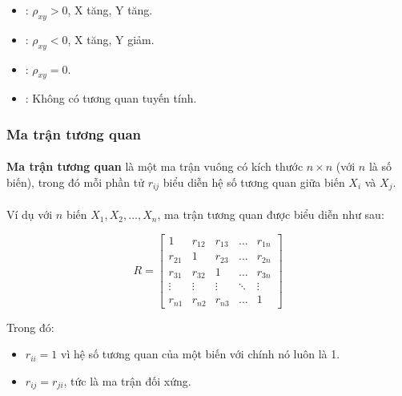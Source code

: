 \begin{itemize}
    \item {}: $\rho_{xy} > 0$, X tăng, Y tăng.
    \item {}: $\rho_{xy} < 0$, X tăng, Y giảm.
    \item {}: $\rho_{xy} = 0$.
    \item {}: Không có tương quan tuyến tính.
\end{itemize}

\subsubsection{Ma trận tương quan}

\paragraph{}{\textbf{Ma trận tương quan} là một ma trận vuông có kích thước \( n \times n \) (với \( n \) là số biến), trong đó mỗi phần tử \( r_{ij} \) biểu diễn hệ số tương quan giữa biến \( X_i \) và \( X_j \).}

\paragraph{}{Ví dụ với \( n \) biến \( X_1, X_2, \dots, X_n \), ma trận tương quan được biểu diễn như sau:}

\[
R =
\begin{bmatrix}
1 & r_{12} & r_{13} & \dots  & r_{1n} \\
r_{21} & 1 & r_{23} & \dots  & r_{2n} \\
r_{31} & r_{32} & 1 & \dots  & r_{3n} \\
\vdots & \vdots & \vdots & \ddots & \vdots \\
r_{n1} & r_{n2} & r_{n3} & \dots  & 1
\end{bmatrix}
\]

Trong đó:
\begin{itemize}
    \item \( r_{ii} = 1 \) vì hệ số tương quan của một biến với chính nó luôn là 1.
    \item \( r_{ij} = r_{ji} \), tức là ma trận đối xứng.
\end{itemize}
